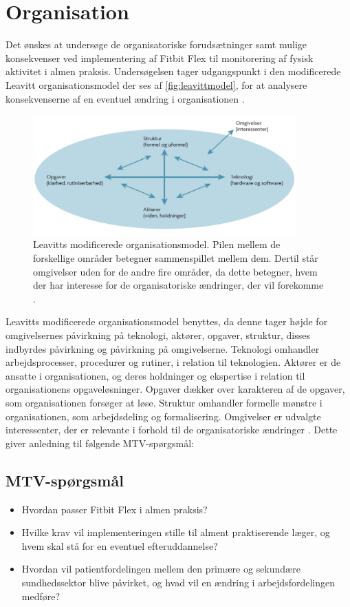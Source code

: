 \section{Organisation}\label{sec:metode_org}
Det ønskes at undersøge de organisatoriske forudsætninger samt mulige konsekvenser ved implementering af Fitbit Flex til monitorering af fysisk aktivitet i almen praksis. Undersøgelsen tager udgangspunkt i den modificerede Leavitt organisationsmodel der ses af \autoref{fig:leavittmodel}, for at analysere konsekvenserne af en eventuel ændring i organisationen \citep{mtvhaandbog}. 

\begin{figure}[H]
\centering
\includegraphics[width=0.9\textwidth]{figures/leavitt}
\caption{Leavitts modificerede organisationsmodel. Pilen mellem de forskellige områder betegner sammenspillet mellem dem. Dertil står omgivelser uden for de andre fire områder, da dette betegner, hvem der har interesse for de organisatoriske ændringer, der vil forekomme \citep{mtvhaandbog}.}
\label{fig:leavittmodel}
\end{figure}

\noindent
Leavitts modificerede organisationsmodel benyttes, da denne tager højde for omgivelsernes påvirkning på teknologi, aktører, opgaver, struktur, disses indbyrdes påvirkning og påvirkning på omgivelserne. 
Teknologi omhandler arbejdsprocesser, procedurer og rutiner, i relation til teknologien.  
Aktører er de ansatte i organisationen, og deres holdninger og ekspertise i relation til organisationens opgaveløsninger. 
Opgaver dækker over karakteren af de opgaver, som organisationen forsøger at løse. 
Struktur omhandler formelle mønstre i organisationen, som arbejdsdeling og formalisering.  
Omgivelser er udvalgte interessenter, der er relevante i forhold til de organisatoriske ændringer \citep{mtvhaandbog}. Dette giver anledning til følgende MTV-spørgsmål:

\subsection{MTV-spørgsmål}
\begin{itemize}
\item Hvordan passer Fitbit Flex i almen praksis? 
\item Hvilke krav vil implementeringen stille til alment praktiserende læger, og hvem skal stå for en eventuel efteruddannelse? 
\item  Hvordan vil patientfordelingen mellem den primære og sekundære sundhedssektor blive påvirket, og hvad vil en ændring i arbejdsfordelingen medføre?
\end{itemize}


